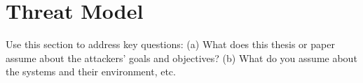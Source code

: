 \section{Threat Model}\label{s:threat-model}

Use this section to address key questions: (a) What does this thesis or paper
assume about the attackers’ goals and objectives? (b) What do you assume about
the systems and their environment, etc.

\textcolor{lightgray}{\lipsum[7-11]}


